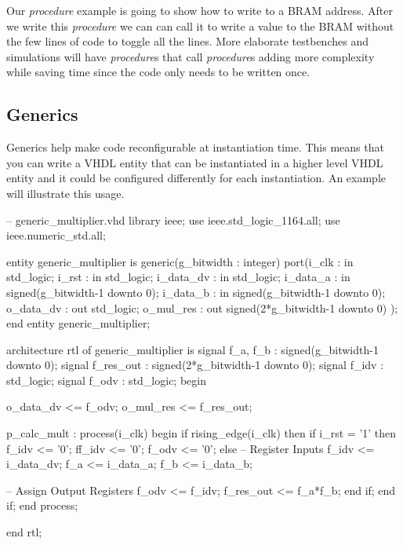 Our \emph{procedure} example is going to show how to write to a \ac{BRAM} address. After we write this \emph{procedure} we can can call it to write a value to the \ac{BRAM} without the few lines of code to toggle all the lines. More elaborate testbenches and simulations will have \emph{procedure}s that call \emph{procedure}s adding more complexity while saving time since the code only needs to be written once. 


\subsection{Generics}

Generics help make code reconfigurable at instantiation time. This means that you can write a \ac{VHDL} entity that can be instantiated in a higher level \ac{VHDL} entity and it could be configured differently for each instantiation. An example will illustrate this usage. 

\begin{VHDLlisting}[tabsize=4]
-- generic_multiplier.vhd
library ieee;
    use ieee.std_logic_1164.all;
    use ieee.numeric_std.all;
	
entity generic_multiplier is
generic(g_bitwidth : integer)
port(i_clk     : in    std_logic;
     i_rst     : in    std_logic;
     i_data_dv : in    std_logic;
     i_data_a  : in    signed(g_bitwidth-1 downto 0);
     i_data_b  : in    signed(g_bitwidth-1 downto 0);
     o_data_dv :   out std_logic; 
     o_mul_res :   out signed(2*g_bitwidth-1 downto 0)
);
end entity generic_multiplier;

architecture rtl of generic_multiplier is
    signal f_a, f_b  : signed(g_bitwidth-1 downto 0);
    signal f_res_out : signed(2*g_bitwidth-1 downto 0);
    signal f_idv     : std_logic;
    signal f_odv     : std_logic;
begin
    
    o_data_dv <= f_odv;
    o_mul_res <= f_res_out;
    
    p_calc_mult : process(i_clk)
    begin
        if rising_edge(i_clk) then
            if i_rst = '1' then
                f_idv  <= '0';
                ff_idv <= '0';
                f_odv  <= '0';
            else
                -- Register Inputs
                f_idv <= i_data_dv;
                f_a <= i_data_a;
                f_b <= i_data_b;
                			
                -- Assign Output Registers
                f_odv <= f_idv;
                f_res_out <= f_a*f_b;		
            end if;
        end if;	
    end process;
    
end rtl;
	 
\end{VHDLlisting}
	
